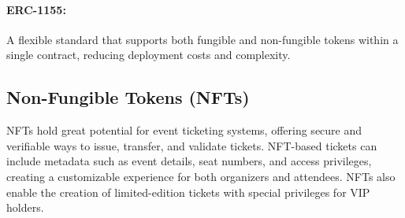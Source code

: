 \paragraph{ERC-1155:}
A flexible standard that supports both fungible and non-fungible tokens within
a single contract, reducing deployment costs and complexity.

\subsection{Non-Fungible Tokens (NFTs)}\label{subsec:nfts}

NFTs hold great potential for event ticketing systems, offering secure and
verifiable ways to issue, transfer, and validate tickets. NFT-based tickets can
include metadata such as event details, seat numbers, and access privileges,
creating a customizable experience for both organizers and attendees. NFTs also
enable the creation of limited-edition tickets with special privileges for VIP
holders.
